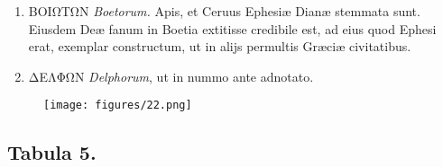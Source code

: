 \documentclass[a4paper, 11pt, oneside, polutonikogreek, latin]{article}
\begin{document}
\begin{enumerate}
    \item \foreignlanguage{greek}{ΒΟΙΩΤΩΝ} \emph{Boetorum.} Apis, et Ceruus Ephesiæ Dianæ stemmata sunt. Eiusdem Deæ fanum in Boetia extitisse credibile est, ad eius quod Ephesi erat, exemplar constructum, ut in alijs permultis Græciæ civitatibus.

    \item \foreignlanguage{greek}{ΔΕΛΦΩΝ} \emph{Delphorum}, ut in nummo ante adnotato.
\end{enumerate}
\clearpage
\vspace*{\fill}
\begin{figure}[H]
\centering
\texttt{[image: figures/22.png]}
\end{figure}
\vspace*{\fill}
\clearpage
\subsection*{Tabula 5.}
\end{document}
